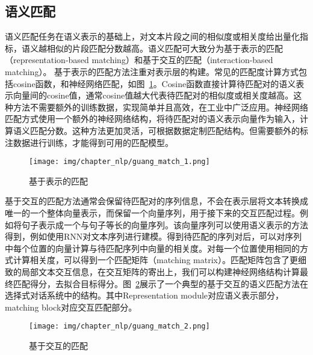 \subsection{语义匹配}
语义匹配任务在语义表示的基础上，对文本片段之间的相似度或相关度给出量化指标，语义越相似的片段匹配分数越高。语义匹配可大致分为基于表示的匹配（representation-based matching）\cite{ feng2015applying}和基于交互的匹配（interaction-based matching）\cite{ zhou2018multi, luspatio}。
基于表示的匹配方法注重对表示层的构建。常见的匹配度计算方式包括cosine函数，和神经网络匹配，如图~\ref{fig:representation_based_matching}。Cosine函数直接计算待匹配对的语义表示向量间的cosine值，通常cosine值越大代表待匹配对的相似度或相关度越高。这种方法不需要额外的训练数据，实现简单并且高效，在工业中广泛应用。神经网络匹配方式使用一个额外的神经网络结构，将待匹配对的语义表示向量作为输入，计算语义匹配分数。这种方法更加灵活，可根据数据定制匹配结构。但需要额外的标注数据进行训练，才能得到可用的匹配模型。

\begin{figure}[h!]
\centering
\texttt{[image: img/chapter\_nlp/guang\_match\_1.png]}
\caption{基于表示的匹配}
\label{fig:representation_based_matching}
\end{figure}

基于交互的匹配方法通常会保留待匹配对的序列信息，不会在表示层将文本转换成唯一的一个整体向量表示，而保留一个向量序列，用于接下来的交互匹配过程。例如将句子表示成一个与句子等长的向量序列。该向量序列可以使用语义表示的方法得到，例如使用RNN对文本序列进行建模。得到待匹配的序列对后，可以对序列中每个位置的向量计算与待匹配序列中向量的相关度。对每一个位置使用相同的方式计算相关度，可以得到一个匹配矩阵（matching matrix）。匹配矩阵包含了更细致的局部文本交互信息，在交互矩阵的寄出上，我们可以构建神经网络结构计算最终匹配得分，去拟合目标得分。图~\ref{fig:interaction_based_matching}展示了一个典型的基于交互的语义匹配方法在选择式对话系统中的结构。其中Representation module对应语义表示部分，matching block对应交互匹配部分。

\begin{figure}[h!]
\centering
\texttt{[image: img/chapter\_nlp/guang\_match\_2.png]}
\caption{基于交互的匹配}
\label{fig:interaction_based_matching}
\end{figure}


